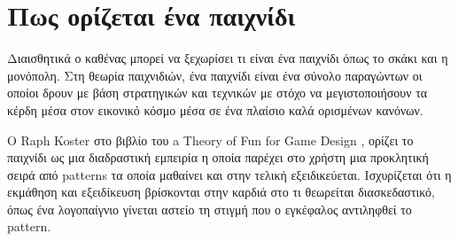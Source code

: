 \section{Πως ορίζεται ένα παιχνίδι}
Διαισθητικά ο καθένας μπορεί να ξεχωρίσει τι είναι ένα παιχνίδι όπως το σκάκι και η μονόπολη. Στη θεωρία παιχνιδιών, ένα παιχνίδι είναι ένα σύνολο παραγώντων οι οποίοι δρουν με βάση στρατηγικών και τεχνικών με στόχο να μεγιστοποιήσουν τα κέρδη μέσα στον εικονικό κόσμο μέσα σε ένα πλαίσιο καλά ορισμένων κανόνων.

Ο Raph Koster στο βιβλίο του a Theory of Fun for Game Design \cite{koster04}, ορίζει το παιχνίδι ως μια διαδραστική εμπειρία η οποία παρέχει στο χρήστη μια προκλητική σειρά από patterns τα οποία μαθαίνει και στην τελική εξειδικεύεται. Ισχυρίζεται ότι η εκμάθηση και εξειδίκευση βρίσκονται στην καρδιά στο τι θεωρείται διασκεδαστικό, όπως ένα λογοπαίγνιο γίνεται αστείο τη στιγμή που ο εγκέφαλος αντιληφθεί το pattern.